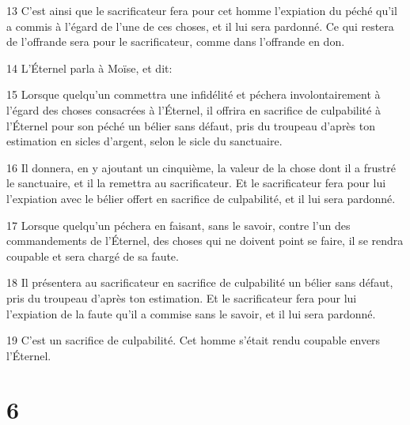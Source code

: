 \par 13 C'est ainsi que le sacrificateur fera pour cet homme l'expiation du péché qu'il a commis à l'égard de l'une de ces choses, et il lui sera pardonné. Ce qui restera de l'offrande sera pour le sacrificateur, comme dans l'offrande en don.
\par 14 L'Éternel parla à Moïse, et dit:
\par 15 Lorsque quelqu'un commettra une infidélité et péchera involontairement à l'égard des choses consacrées à l'Éternel, il offrira en sacrifice de culpabilité à l'Éternel pour son péché un bélier sans défaut, pris du troupeau d'après ton estimation en sicles d'argent, selon le sicle du sanctuaire.
\par 16 Il donnera, en y ajoutant un cinquième, la valeur de la chose dont il a frustré le sanctuaire, et il la remettra au sacrificateur. Et le sacrificateur fera pour lui l'expiation avec le bélier offert en sacrifice de culpabilité, et il lui sera pardonné.
\par 17 Lorsque quelqu'un péchera en faisant, sans le savoir, contre l'un des commandements de l'Éternel, des choses qui ne doivent point se faire, il se rendra coupable et sera chargé de sa faute.
\par 18 Il présentera au sacrificateur en sacrifice de culpabilité un bélier sans défaut, pris du troupeau d'après ton estimation. Et le sacrificateur fera pour lui l'expiation de la faute qu'il a commise sans le savoir, et il lui sera pardonné.
\par 19 C'est un sacrifice de culpabilité. Cet homme s'était rendu coupable envers l'Éternel.

\chapter{6}

